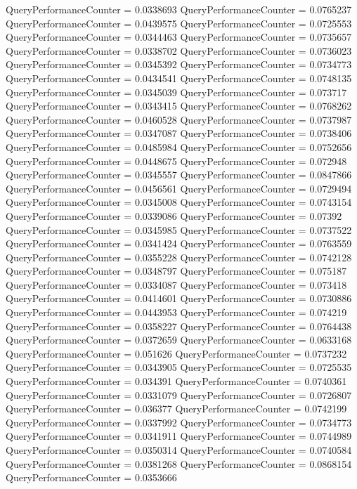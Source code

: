 \documentclass[9pt]{article}
\theoremstyle{plain}
\theoremstyle{definition}
\theoremstyle{remark}
\numberwithin{equation}{section}
\begin{document}
QueryPerformanceCounter  =  0.0338693
QueryPerformanceCounter  =  0.0765237
QueryPerformanceCounter  =  0.0439575
QueryPerformanceCounter  =  0.0725553
QueryPerformanceCounter  =  0.0344463
QueryPerformanceCounter  =  0.0735657
QueryPerformanceCounter  =  0.0338702
QueryPerformanceCounter  =  0.0736023
QueryPerformanceCounter  =  0.0345392
QueryPerformanceCounter  =  0.0734773
QueryPerformanceCounter  =  0.0434541
QueryPerformanceCounter  =  0.0748135
QueryPerformanceCounter  =  0.0345039
QueryPerformanceCounter  =  0.073717
QueryPerformanceCounter  =  0.0343415
QueryPerformanceCounter  =  0.0768262
QueryPerformanceCounter  =  0.0460528
QueryPerformanceCounter  =  0.0737987
QueryPerformanceCounter  =  0.0347087
QueryPerformanceCounter  =  0.0738406
QueryPerformanceCounter  =  0.0485984
QueryPerformanceCounter  =  0.0752656
QueryPerformanceCounter  =  0.0448675
QueryPerformanceCounter  =  0.072948
QueryPerformanceCounter  =  0.0345557
QueryPerformanceCounter  =  0.0847866
QueryPerformanceCounter  =  0.0456561
QueryPerformanceCounter  =  0.0729494
QueryPerformanceCounter  =  0.0345008
QueryPerformanceCounter  =  0.0743154
QueryPerformanceCounter  =  0.0339086
QueryPerformanceCounter  =  0.07392
QueryPerformanceCounter  =  0.0345985
QueryPerformanceCounter  =  0.0737522
QueryPerformanceCounter  =  0.0341424
QueryPerformanceCounter  =  0.0763559
QueryPerformanceCounter  =  0.0355228
QueryPerformanceCounter  =  0.0742128
QueryPerformanceCounter  =  0.0348797
QueryPerformanceCounter  =  0.075187
QueryPerformanceCounter  =  0.0334087
QueryPerformanceCounter  =  0.073418
QueryPerformanceCounter  =  0.0414601
QueryPerformanceCounter  =  0.0730886
QueryPerformanceCounter  =  0.0443953
QueryPerformanceCounter  =  0.074219
QueryPerformanceCounter  =  0.0358227
QueryPerformanceCounter  =  0.0764438
QueryPerformanceCounter  =  0.0372659
QueryPerformanceCounter  =  0.0633168
QueryPerformanceCounter  =  0.051626
QueryPerformanceCounter  =  0.0737232
QueryPerformanceCounter  =  0.0343905
QueryPerformanceCounter  =  0.0725535
QueryPerformanceCounter  =  0.034391
QueryPerformanceCounter  =  0.0740361
QueryPerformanceCounter  =  0.0331079
QueryPerformanceCounter  =  0.0726807
QueryPerformanceCounter  =  0.036377
QueryPerformanceCounter  =  0.0742199
QueryPerformanceCounter  =  0.0337992
QueryPerformanceCounter  =  0.0734773
QueryPerformanceCounter  =  0.0341911
QueryPerformanceCounter  =  0.0744989
QueryPerformanceCounter  =  0.0350314
QueryPerformanceCounter  =  0.0740584
QueryPerformanceCounter  =  0.0381268
QueryPerformanceCounter  =  0.0868154
QueryPerformanceCounter  =  0.0353666
\end{document}
